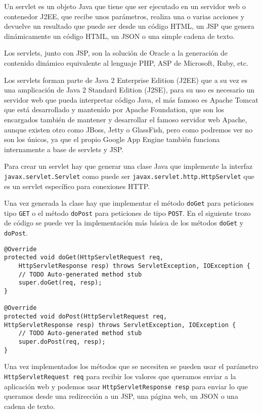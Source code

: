 Un servlet es un objeto Java que tiene que ser ejecutado en un servidor web o contenedor J2EE, que recibe unos parámetros, realiza una o varias acciones y devuelve un resultado que puede ser desde un código HTML, un JSP que genera dinámicamente un código HTML, un JSON o una simple cadena de texto.

Los servlets, junto con JSP, son la solución de Oracle a la generación de contenido dinámico equivalente al lenguaje PHP, ASP de Microsoft, Ruby, etc.

Los servlets forman parte de Java 2 Enterprise Edition (J2EE) que a su vez es una amplicación de Java 2 Standard Edition (J2SE), para su uso es necesario un servidor web que pueda interpretar código Java, el más famoso es Apache Tomcat que está desarrollado y mantenido por Apache Foundation, que son los encargados también de mantener y desarrollar el famoso servidor web Apache, aunque existen otro como JBoss, Jetty o GlassFish, pero como podremos ver no son los únicos, ya que el propio Google App Engine también funciona internamente a base de servlets y JSP.

Para crear un servlet hay que generar una clase Java que implemente la interfaz \lstinline{javax.servlet.Servlet} como puede ser \lstinline{javax.servlet.http.HttpServlet} que es un servlet específico para conexiones HTTP.
 
Una vez generada la clase hay que implementar el método \lstinline{doGet} para peticiones tipo \lstinline{GET} o el método \lstinline{doPost} para peticiones de tipo \lstinline{POST}. En el siguiente trozo de código se puede ver la implementación más básica de los métodos \lstinline{doGet} y \lstinline{doPost}.

\begin{lstlisting}[style=Java] 
@Override
protected void doGet(HttpServletRequest req, 
	HttpServletResponse resp) throws ServletException, IOException {
	// TODO Auto-generated method stub
	super.doGet(req, resp);
}

@Override
protected void doPost(HttpServletRequest req, 
HttpServletResponse resp) throws ServletException, IOException {
	// TODO Auto-generated method stub
	super.doPost(req, resp);
}
\end{lstlisting}

Una vez implementados los métodos que se necesiten se pueden usar el parámetro \lstinline{HttpServletRequest req} para recibir los valores que queramos enviar a la aplicación web y podemos usar \lstinline{HttpServletResponse resp} para enviar lo que queramos desde una redirección a un JSP, una página web, un JSON o una cadena de texto. 

